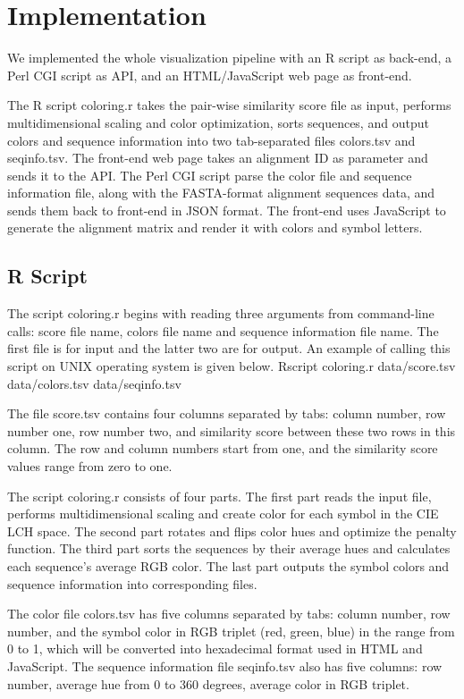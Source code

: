 \chapter{Implementation}\label{chap:Implementation}

We implemented the whole visualization pipeline with an R script as back-end, a Perl CGI script as API, and an HTML/JavaScript web page as front-end.

The R script coloring.r takes the pair-wise similarity score file as input, performs multidimensional scaling and color optimization, sorts sequences, and output colors and sequence information into two tab-separated files colors.tsv and seqinfo.tsv. The front-end web page takes an alignment ID as parameter and sends it to the API. The Perl CGI script parse the color file and sequence information file, along with the FASTA-format alignment sequences data, and sends them back to front-end in JSON format. The front-end uses JavaScript to generate the alignment matrix and render it with colors and symbol letters.

\section{R Script}

The script coloring.r begins with reading three arguments from command-line calls: score file name, colors file name and sequence information file name. The first file is for input and the latter two are for output. An example of calling this script on UNIX operating system is given below.
Rscript coloring.r data/score.tsv data/colors.tsv data/seqinfo.tsv

The file score.tsv contains four columns separated by tabs: column number, row number one, row number two, and similarity score between these two rows in this column. The row and column numbers start from one, and the similarity score values range from zero to one.

The script coloring.r consists of four parts. The first part reads the input file, performs multidimensional scaling and create color for each symbol in the CIE LCH space. The second part rotates and flips color hues and optimize the penalty function. The third part sorts the sequences by their average hues and calculates each sequence’s average RGB color. The last part outputs the symbol colors and sequence information into corresponding files.

The color file colors.tsv has five columns separated by tabs: column number, row number, and the symbol color in RGB triplet (red, green, blue) in the range from 0 to 1, which will be converted into hexadecimal format used in HTML and JavaScript. The sequence information file seqinfo.tsv also has five columns: row number, average hue from 0 to 360 degrees, average color in RGB triplet.

